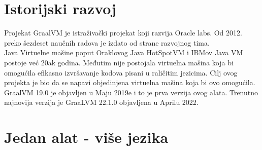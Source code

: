 \documentclass[a4paper]{article}
\begin{document}
\section{Istorijski razvoj}
\label{subsec:Istorijski razvoj}

Projekat GraalVM je istraživački projekat koji razvija Oracle labs. Od 2012. preko šezdeset naučnih radova je izdato od strane razvojnog tima. \\

Java Virtuelne mašine poput Oraklovog Java HotSpotVM i IBMov Java VM postoje već 20ak godina. Međutim nije postojala virtuelna mašina koja bi omogućila efikasno izvršavanje kodova pisani u raličitim jezicima. Cilj ovog projekta je bio da se napavi objedinjena virtuelna mašina koja bi ovo omogućila.\\

GraalVM 19.0 je objavljen u Maju 2019e i to je prva verzija ovog alata. Trenutno najnovija verzija je GraaLVM 22.1.0 objavljena u Aprilu 2022. 



\section{Jedan alat - više jezika}
\end{document}
